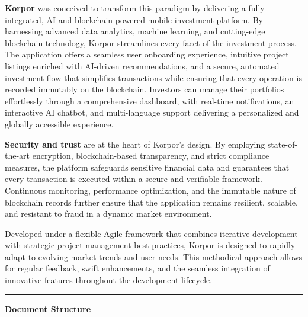 \noindent \textbf{\textcolor{primary}{Korpor}} was conceived to transform this paradigm by delivering a fully integrated, AI and blockchain-powered mobile investment platform. By harnessing advanced data analytics, machine learning, and cutting-edge blockchain technology, Korpor streamlines every facet of the investment process. The application offers a seamless user onboarding experience, intuitive project listings enriched with AI-driven recommendations, and a secure, automated investment flow that simplifies transactions while ensuring that every operation is recorded immutably on the blockchain. Investors can manage their portfolios effortlessly through a comprehensive dashboard, with real-time notifications, an interactive AI chatbot, and multi-language support delivering a personalized and globally accessible experience.

\noindent \textbf{\textcolor{primary}{Security and trust}} are at the heart of Korpor's design. By employing state-of-the-art encryption, blockchain-based transparency, and strict compliance measures, the platform safeguards sensitive financial data and guarantees that every transaction is executed within a secure and verifiable framework. Continuous monitoring, performance optimization, and the immutable nature of blockchain records further ensure that the application remains resilient, scalable, and resistant to fraud in a dynamic market environment.

\noindent Developed under a flexible Agile framework that combines iterative development with strategic project management best practices, Korpor is designed to rapidly adapt to evolving market trends and user needs. This methodical approach allows for regular feedback, swift enhancements, and the seamless integration of innovative features throughout the development lifecycle.

\vspace{0.05cm}
\begin{center}
\textcolor{primary}{\rule{0.3\textwidth}{0.4pt}}
\end{center}
\vspace{0.05cm}

\noindent \textbf{\textcolor{primary}{Document Structure}}

